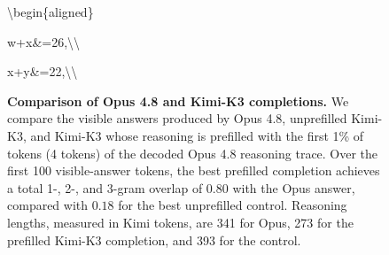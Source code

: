 \begin{figure}[H]
\begin{answercol}[equal height group=ansX0]
  \textbackslash{}begin\{aligned\}\par\vspace{2pt}
  w+x\&=26,\textbackslash{}\textbackslash{}\par\vspace{2pt}
  x+y\&=22,\textbackslash{}\textbackslash{}\par\vspace{3pt}\elide
\end{answercol}
\caption{\textbf{Comparison of Opus 4.8 and Kimi-K3 completions.} We compare
the visible answers produced by Opus 4.8, unprefilled Kimi-K3, and Kimi-K3
whose reasoning is prefilled with the first 1\% of tokens (4 tokens) of the decoded
Opus 4.8 reasoning trace. Over the first 100 visible-answer tokens, the best
prefilled completion achieves a total 1-, 2-, and 3-gram overlap of $0.80$
with the Opus answer, compared with $0.18$ for the best unprefilled control.
Reasoning lengths, measured in Kimi tokens, are 341 for Opus, 273 for the
prefilled Kimi-K3 completion, and 393 for the control.}
\label{fig:aime15_style_transfer}
\end{figure}
